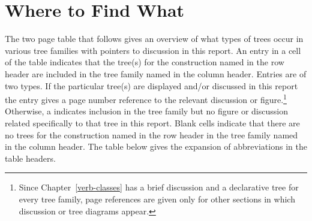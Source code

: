 \chapter{Where to Find What}
\label{table-intro}

The two page table that follows gives an overview of what types of trees occur
in various tree families with pointers to discussion in this report.  An
entry in a cell of the table indicates that the tree(s) for the construction
named in the row header are included in the tree family named in the column
header. Entries are of two types.  If the particular tree(s) are displayed
and/or discussed in this report the entry gives a page number reference to the
relevant discussion or figure.\footnote{Since Chapter~\ref{verb-classes} has a
brief discussion and a declarative tree for every tree family, page references
are given only for other sections in which discussion or tree diagrams appear.}
Otherwise, a \xtagcheck \space indicates inclusion in the tree family but no
figure or discussion related specifically to that tree in this report.  Blank
cells indicate that there are no trees for the construction named in the row
header in the tree family named in the column header.  The table below gives
the expansion of abbreviations in the table headers.

\vspace{0.3in}

